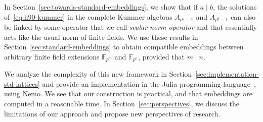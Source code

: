 In Section~\ref{sec:towards-standard-embeddings}, we show that if $a\mid b$, the solutions
of~\eqref{eq:h90-kummer} in the complete Kummer algebras $A_{p^a-1}$ and
$A_{p^b-1}$ can also be linked by some operator that we call \emph{scalar norm
operator} and that essentially acts like the usual norm of finite fields.
We use these results in Section~\ref{sec:standard-embeddings} to obtain
compatible embeddings between arbitrary finite field extensions
$\mathbb{F}_{p^m}$ and $\mathbb{F}_{p^n}$, provided that $m\mid n$.

We analyze the complexity of this new framework in
Section~\ref{sec:implementation-std-lattices} and provide an implementation in
the Julia programming language~\cite{Julia}, using Nemo. We see that our
construction is practical, and that embeddings are computed in a reasonable
time. In Section~\ref{sec:perspectives}, we discuss the limitations of our
approach and propose new perspectives of research.
